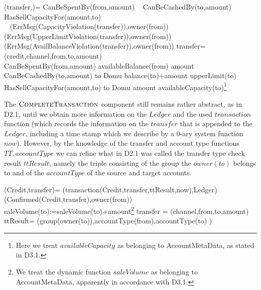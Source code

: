\begin{asm}
(transfer,)=\+
   \IF CanBeSpentBy(from,amount) \+
      \THEN ~ \IF CanBeCashedBy(to,amount) \+
         \THEN ~ \IF HasSellCapacityFor(amount,to) \+
            \THEN ~  \\
            \ELSE 
             ~ (ErrMsg(CapacityViolation(transfer)),\TO owner(from))\-
         \ELSE 
         ~ (ErrMsg(UpperLimitViolation(transfer)),\TO owner(from))\-
      \ELSE 
      ~ (ErrMsg(AvailBalanceViolation(transfer)),\TO owner(from))\dec\-
      \WHERE \+
transfer=(credit,channel,from,to,amount)\\
CanBeSpentBy(from,amount) \IFF availableBalance(from) \geq amount \\
CanBeCashedBy(to,amount) \IFF  
    to \not \in Domu \AND balance(to)+amount \leq upperLimit(to) \\
 HasSellCapacityFor(amount,to) \IFF  to \not \in Domu \AND   amount \leq availableCapacity(to)\footnote{Here we treat $availableCapacity$ as belonging to AccountMetaData, as stated in D3.1.}
\end{asm}


The $\hbox{\sc CompleteTransaction}$ component still remains rather abstract, as in D2.1, until we obtain more information on the $Ledger$ and the used  $transaction$ function (which records the information on the $transfer$ that is appended to the $Ledger$, including a time stamp which we describe by a 0-ary system function $now$). However, by the knowledge of the transfer and account type functions $TT, accountType$ we can refine what in D2.1 was called the transfer type check result $ttResult$, namely the triple consisting of the group the $owner(to)$ belongs to and of the $accountType$ of the source and target accounts.

\begin{asm}
(Credit,transfer)=\+   
   (transaction(Credit,transfer,ttResult,now),Ledger)\\
   (Confirmed(Credit,transfer),\TO owner(from))\\
   saleVolume(to):=saleVolume(to)+amount\footnote{We treat the dynamic function $saleVolume$ as belonging to AccountMetaData, apparently in accordance with D3.1.} \-
\WHERE \+
 transfer = (channel,from,to,amount)\\
 ttResult= (group(owner(to)),accountType(from),accountType(to) )
\end{asm}



